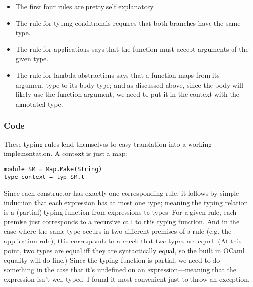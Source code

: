 \documentclass[pageno]{jpaper}
\begin{document}
{\begin{prooftree}
\end{prooftree}

\begin{prooftree}
\end{prooftree}

\begin{prooftree}
\end{prooftree}

\begin{itemize}
\item The first four rules are pretty self explanatory.
\item The rule for typing conditionals requires that both branches have the same type.
\item The rule for applications says that the function must accept arguments of the given type.
\item The rule for lambda abstractions says that a function maps from its argument type to its body type; and
as discussed above, since the body will likely use the function argument, we need to put it
in the context with the annotated type.
\end{itemize}

\subsubsection{Code}
These typing rules lend themselves to
easy translation into a working implementation. A context is just a map:
\begin{lstlisting}
module SM = Map.Make(String)
type context = typ SM.t
\end{lstlisting}

Since each constructor has exactly one corresponding rule, it follows by simple induction that
each expression has at most one type; meaning the typing relation is a (partial) typing function from expressions
to types. For a given rule, each premise just corresponds to a recursive call to this typing
function. And in the case where the same type occurs in two different premises of a rule (e.g. the application rule), this corresponds to a check that two types are equal. (At this point, two types are equal iff they are
syntactically equal, so the built in OCaml equality will do fine.)
Since the typing function is partial, we need to do something in the case that it's undefined on
an expression---meaning that the expression isn't well-typed.  I found it most convenient just to throw an
exception.

}
\end{document}
